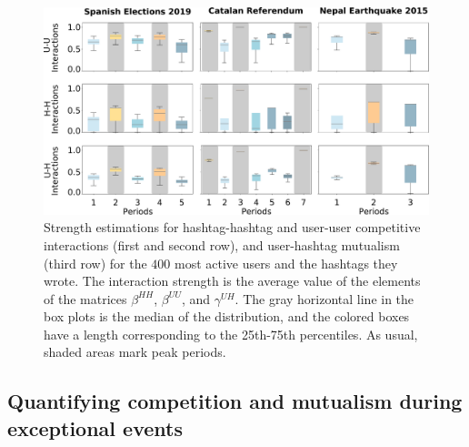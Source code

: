 \begin{figure}[t]
    \centering
   \includegraphics[width=1\textwidth]{figures/chp3/fig7.pdf}
   
    \caption[Strength estimations for competitive and mutualistic interactions]{Strength estimations for hashtag-hashtag and user-user competitive interactions (first and second row), and user-hashtag mutualism (third row) for the $400$ most active users and the hashtags they wrote. The interaction strength is the average value of the elements of the matrices $\beta^{HH}$, $\beta^{UU}$, and $\gamma^{UH}$. The gray horizontal line in the box plots is the median of the distribution, and the colored boxes have a length corresponding to the 25th-75th percentiles. As usual, shaded areas mark peak periods.}
   \label{chp3:fig:7}
\end{figure}



\subsection{Quantifying competition and mutualism during exceptional events}
\label{chp3:2.3}


